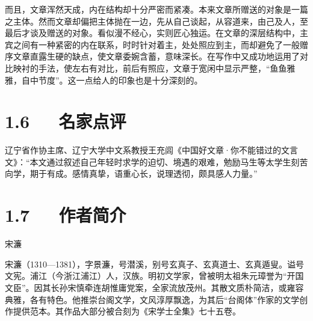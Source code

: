 \documentclass[letterpaper,12pt,english]{sphinxmanual}
\begin{document}
而且，文章浑然天成，内在结构却十分严密而紧凑。本来文章所赠送的对象是一篇之主体。然而文章却偏把主体抛在一边，先从自己谈起，从容道来，由己及人，至最后才谈及赠送的对象。看似漫不经心，实则匠心独运。在文章的深层结构中，主宾之间有一种紧密的内在联系，时时针对着主，处处照应到主，而却避免了一般赠序文章直露生硬的缺点，使文章委婉含蓄，意味深长。在写作中又成功地运用了对比映衬的手法，使左右有对比，前后有照应，文章于宽闲中显示严整，“鱼鱼雅雅，自中节度”。这一点给人的印象也是十分深刻的。


\section{1.6   名家点评}
\label{\detokenize{p01_u6563_u6587/_u5b8b_u6fc2-_u9001_u4e1c_u9633_u9a6c_u751f_u5e8f:id12}}
辽宁省作协主席、辽宁大学中文系教授王充闾《中国好文章·你不能错过的文言文》：“本文通过叙述自己年轻时求学的迫切、境遇的艰难，勉励马生等太学生刻苦向学，期于有成。感情真挚，语重心长，说理透彻，颇具感人力量。”


\section{1.7   作者简介}
\label{\detokenize{p01_u6563_u6587/_u5b8b_u6fc2-_u9001_u4e1c_u9633_u9a6c_u751f_u5e8f:id13}}
宋濂

宋濂（1310—1381），字景濂，号潜溪，别号玄真子、玄真道士、玄真遁叟。谥号文宪。浦江（今浙江浦江）人，汉族。明初文学家，曾被明太祖朱元璋誉为“开国文臣”。因其长孙宋慎牵连胡惟庸党案，全家流放茂州。其散文质朴简洁，或雍容典雅，各有特色。他推崇台阁文学，文风淳厚飘逸，为其后“台阁体”作家的文学创作提供范本。其作品大部分被合刻为《宋学士全集》七十五卷。
\end{document}
